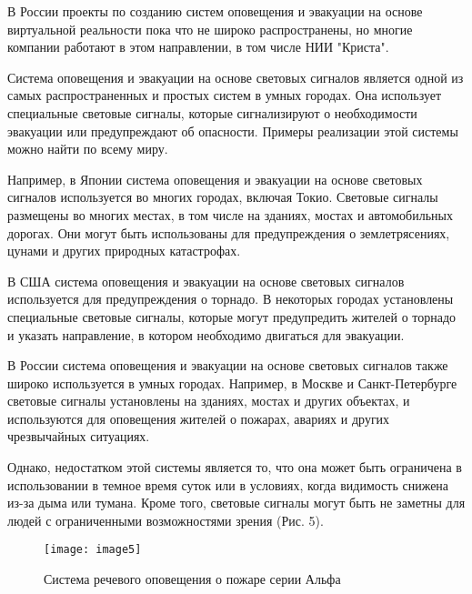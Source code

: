 \begin{multicols}{2}
В России проекты по созданию систем оповещения и эвакуации на основе
виртуальной реальности пока что не широко распространены, но многие
компании работают в этом направлении, в том числе НИИ "Криста".

Система оповещения и эвакуации на основе световых сигналов является
одной из самых распространенных и простых систем в умных городах. Она
использует специальные световые сигналы, которые сигнализируют о
необходимости эвакуации или предупреждают об опасности. Примеры
реализации этой системы можно найти по всему миру.

Например, в Японии система оповещения и эвакуации на основе световых
сигналов используется во многих городах, включая Токио. Световые
сигналы размещены во многих местах, в том числе на зданиях, мостах и
автомобильных дорогах. Они могут быть использованы для предупреждения
о землетрясениях, цунами и других природных катастрофах.

В США система оповещения и эвакуации на основе световых сигналов
используется для предупреждения о торнадо. В некоторых городах
установлены специальные световые сигналы, которые могут предупредить
жителей о торнадо и указать направление, в котором необходимо
двигаться для эвакуации.

В России система оповещения и эвакуации на основе световых сигналов
также широко используется в умных городах. Например, в Москве и
Санкт-Петербурге световые сигналы установлены на зданиях, мостах и
других объектах, и используются для оповещения жителей о пожарах,
авариях и других чрезвычайных ситуациях.

Однако, недостатком этой системы является то, что она может быть
ограничена в использовании в темное время суток или в условиях, когда
видимость снижена из-за дыма или тумана. Кроме того, световые сигналы
могут быть не заметны для людей с ограниченными возможностями зрения
(Рис. 5).

\end{multicols}

\begin{figure}[H]
\centering
\texttt{[image: image5]}
\caption{Система речевого оповещения о пожаре серии Альфа}
\end{figure}

